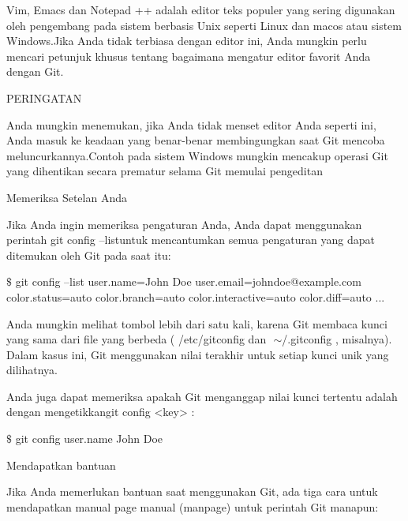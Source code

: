 \noindent 
Vim, Emacs dan Notepad ++ adalah editor teks populer yang sering digunakan oleh pengembang pada sistem berbasis Unix seperti Linux dan macos atau sistem Windows.Jika Anda tidak terbiasa dengan editor ini, Anda mungkin perlu mencari petunjuk khusus tentang bagaimana mengatur editor favorit Anda dengan Git. \par
\vspace{12pt}
\noindent 
PERINGATAN \par
\vspace{12pt}
\noindent 
Anda mungkin menemukan, jika Anda tidak menset editor Anda seperti ini, Anda masuk ke keadaan yang benar-benar membingungkan saat Git mencoba meluncurkannya.Contoh pada sistem Windows mungkin mencakup operasi Git yang dihentikan secara prematur selama Git memulai pengeditan \par
\vspace{12pt}
\noindent 
Memeriksa Setelan Anda \par
\vspace{12pt}
\noindent 
Jika Anda ingin memeriksa pengaturan Anda, Anda dapat menggunakan perintah $  $git config --listuntuk mencantumkan semua pengaturan yang dapat ditemukan oleh Git pada saat itu: \par
\vspace{12pt}
\noindent 
  $  \$  $ git config --list user.name=John Doe user.email=johndoe@example.com color.status=auto color.branch=auto color.interactive=auto color.diff=auto ...  \par
\vspace{12pt}
\noindent 
Anda mungkin melihat tombol lebih dari satu kali, karena Git membaca kunci yang sama dari file yang berbeda ( $  $/etc/gitconfig $  $dan $  $ $  \sim  $/.gitconfig $  $, misalnya). $  $Dalam kasus ini, Git menggunakan nilai terakhir untuk setiap kunci unik yang dilihatnya. \par
\vspace{12pt}
\noindent 
Anda juga dapat memeriksa apakah Git menganggap nilai kunci tertentu adalah dengan mengetikkangit config <key> $  $: \par
\vspace{12pt}
\noindent 
  $  \$  $ git config user.name John Doe  \par
\vspace{12pt}
\noindent 
Mendapatkan bantuan \par
\vspace{12pt}
\noindent 
Jika Anda memerlukan bantuan saat menggunakan Git, ada tiga cara untuk mendapatkan manual page manual (manpage) untuk perintah Git manapun: \par
